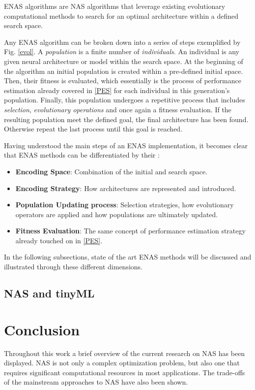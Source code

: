 \documentclass[10pt,        %
               a4paper,     %
               journal,     %
               ]{IEEEtran}
\begin{document}
ENAS algorithms are NAS algorithms that leverage existing evolutionary computational methods
to search for an optimal architecture within a defined search space.

Any ENAS algorithm can be broken down into a series of steps exemplified by Fig. \ref{evol}. A \textit{population} is
a finite number of \textit{individuals}. An individual is any given neural architecture or model within the search space.
At the beginning of the algorithm an initial population is created within a pre-defined initial space.
Then, their fitness is evaluated, which essentially is the process of performance estimation already covered in \ref{PES}
for each individual in this generation's population. Finally, this population undergoes a repetitive process that
includes \textit{selection}, \textit{evolutionary operations} and once again a fitness evaluation. If the resulting
population meet the defined goal, the final architecture has been found. Otherwise repeat the last process until this
goal is reached.

Having understood the main steps of an ENAS implementation, it becomes clear that ENAS methods can be
differentiated by their \cite{liu2021survey}:
\begin{itemize}
    \item \textbf{Encoding Space}: Combination of the initial and search space.

    \item \textbf{Encoding Strategy}: How architectures are represented and introduced.

    \item \textbf{Population Updating process}: Selection strategies, how evolutionary operators are applied
        and how populations are ultimately updated.

    \item \textbf{Fitness Evaluation}: The same concept of performance estimation strategy already touched on
        in \ref{PES}.
\end{itemize}

In the following subsections, state of the art ENAS methods will be discussed and illustrated through
these different dimensions.


\subsection{NAS and tinyML}

\section{Conclusion}
Throughout this work a brief overview of the current research on NAS has been displayed. NAS is not only
a complex optimization problem, but also one that requires significant computational resources in most applications. The
trade-offs of the mainstream approaches to NAS have also been shown.
\end{document}
